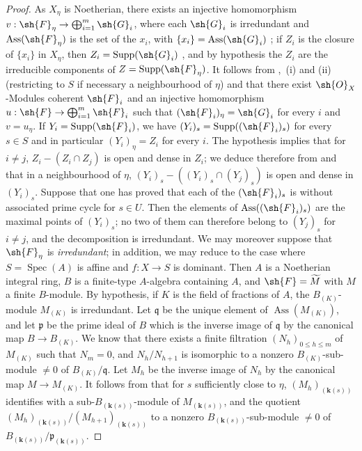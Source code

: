 \begin{proof}
As $X_\eta$ is Noetherian, there exists an injective homomorphism $v:\sh{F}_\eta\to\bigoplus_{i=1}^m\sh{G}_i$, where each $\sh{G}_i$ is irredundant and $\operatorname{Ass}(\sh{F}_\eta)$ is the set of the $x_i$, with $\{x_i\}=\operatorname{Ass}(\sh{G}_i)$ ; if $Z_i$ is the closure of $\{x_i\}$ in $X_\eta$, then $Z_i=\operatorname{Supp}(\sh{G}_i)$ , and by hypothesis the $Z_i$ are the irreducible components of $Z=\operatorname{Supp}(\sh{F}_\eta)$.
It follows from ,~(i) and (ii) (restricting to $S$ if necessary a neighbourhood of $\eta$) and  that there exist $\sh{O}_X$-Modules coherent $\sh{F}_i$ and an injective homomorphism $u:\sh{F}\to\bigoplus_{i=1}^m\sh{F}_i$ such that $(\sh{F}_i)_\eta=\sh{G}_i$ for every $i$ and $v=u_\eta$.
If $Y_i=\operatorname{Supp}(\sh{F}_i)$, we have $(Y_i)_s=\operatorname{Supp}((\sh{F}_i)_s)$ for every $s\in S$  and in particular $(Y_i)_\eta=Z_i$ for every $i$.
The hypothesis implies that for $i\neq j$, $Z_i-(Z_i\cap Z_j)$ is open and dense in $Z_i$; we deduce therefore from  and  that in a neighbourhood of $\eta$, $(Y_i)_s-((Y_i)_s\cap(Y_j)_s)$ is open and dense in $(Y_i)_s$.
Suppose that one has proved that each of the $(\sh{F}_i)_s$ is without associated prime cycle for $s\in U$.
Then the elements of $\operatorname{Ass}((\sh{F}_i)_s)$ are the maximal points of $(Y_i)_s$; no two of them can therefore belong to $(Y_j)_s$ for $i\neq j$, and the decomposition is irredundant. We may moreover suppose that $\sh{F}_\eta$ is \emph{irredundant}; in addition, we may reduce to the case where $S=\operatorname{Spec}(A)$ is affine and $f:X\to S$ is dominant. Then $A$ is a Noetherian integral ring, $B$ is a finite-type $A$-algebra containing $A$, and $\sh{F}=\widetilde{M}$ with $M$ a finite $B$-module. By hypothesis, if $K$ is the field of fractions of $A$, the $B_{(K)}$-module $M_{(K)}$ is irredundant.
Let $\mathfrak{q}$ be the unique element of $\operatorname{Ass}(M_{(K)})$, and let $\mathfrak{p}$ be the prime ideal of $B$ which is the inverse image of $\mathfrak{q}$ by the canonical map $B\to B_{(K)}$.
We know  that there exists a finite filtration $(N_h)_{0\leqslant h\leqslant m}$ of $M_{(K)}$ such that $N_m=0$, and $N_h/N_{h+1}$ is isomorphic to a nonzero $B_{(K)}$-sub-module $\neq 0$ of $B_{(K)}/\mathfrak{q}$.
Let $M_h$ be the inverse image of $N_h$ by the canonical map $M\to M_{(K)}$.
It follows from  that for $s$ sufficiently close to $\eta$, $(M_h)_{(\boldsymbol{k}(s))}$ identifies with a sub-$B_{(\boldsymbol{k}(s))}$-module of $M_{(\boldsymbol{k}(s))}$, and the quotient $(M_h)_{(\boldsymbol{k}(s))}/(M_{h+1})_{(\boldsymbol{k}(s))}$ to a nonzero $B_{(\boldsymbol{k}(s))}$-sub-module $\neq 0$ of $B_{(\boldsymbol{k}(s))}/\mathfrak{p}_{(\boldsymbol{k}(s))}$.

\end{proof}
